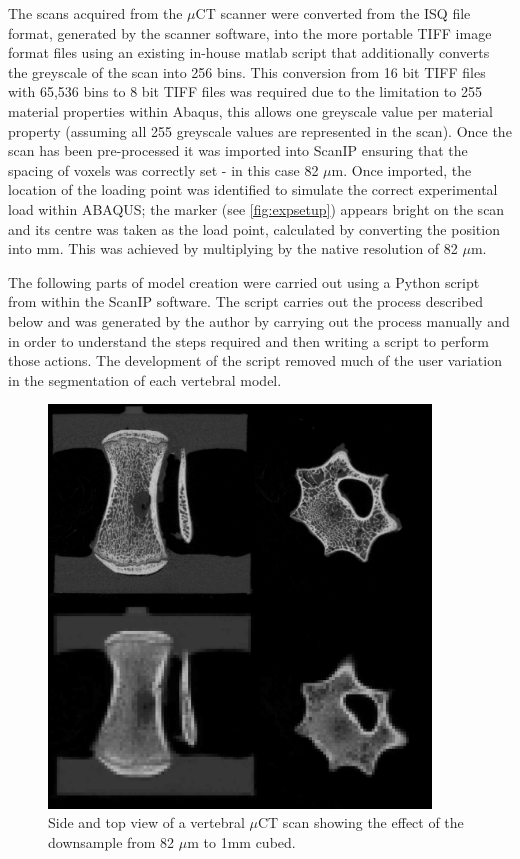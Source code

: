 The scans acquired from the \(\mu\)CT scanner were converted from the ISQ file
format, generated by the scanner software, into the more portable TIFF image
format files using an existing in-house  matlab script that additionally
converts the greyscale of the scan into 256 bins. This conversion from 16 bit
TIFF files with 65,536 bins to 8 bit TIFF files was required due to the
limitation to 255 material properties within Abaqus, this allows one greyscale
value per material property (assuming all 255 greyscale values are represented
in the scan). Once the scan has been pre-processed it was imported into ScanIP
ensuring that the spacing of voxels was correctly set - in this case 82
\(\mu\)m.  Once imported, the location of the loading point was identified to
simulate the correct experimental load within ABAQUS; the marker (see
\cref{fig:expsetup}) appears bright on the scan and its centre was taken as the
load point, calculated by converting the position into mm. This was achieved by
multiplying by the native resolution of 82 \(\mu\)m.

The following parts of model creation were carried out using a Python script
from within the ScanIP software. The script carries out the process described
below and was generated by the author by carrying out the process manually and
in order to understand the steps required and then writing a script to perform
those actions. The development of the script removed much of the user variation
in the segmentation of each vertebral model.

\begin{figure}[ht!]
\centering
  \includegraphics[width=4in]{images/compofDownsample.png}
  \caption{Side and top view of a vertebral $\mu$CT scan showing the effect of the downsample from 82 $\mu$m to 1mm cubed.}
\label{fig:compofDownsample}
\end{figure}




